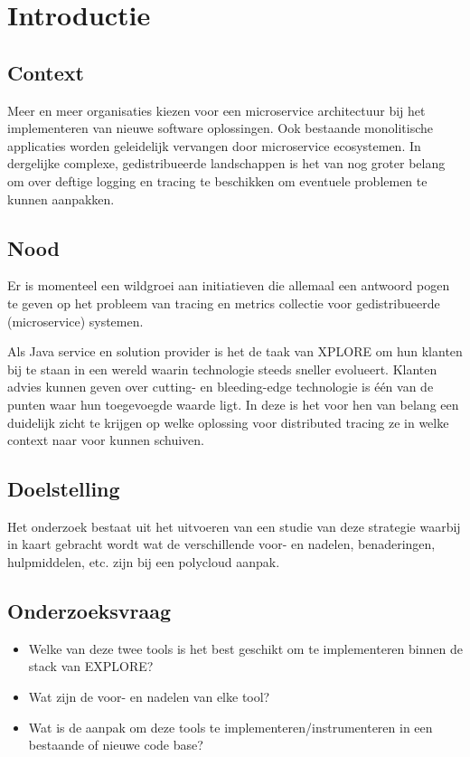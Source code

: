 
\section{Introductie} %
\label{sec:introductie}

\subsection{Context}
Meer en meer organisaties kiezen voor een microservice
architectuur bij het implementeren van nieuwe software
oplossingen. Ook bestaande monolitische applicaties
worden geleidelijk vervangen door microservice
ecosystemen. In dergelijke complexe, gedistribueerde
landschappen is het van nog groter belang om over deftige
logging en tracing te beschikken om eventuele problemen
te kunnen aanpakken.

\subsection{Nood}
Er is momenteel een wildgroei aan initiatieven die allemaal
een antwoord pogen te geven op het probleem van tracing
en metrics collectie voor gedistribueerde (microservice)
systemen.

Als Java service en solution provider is het de taak van XPLORE om
hun klanten bij te staan in een wereld waarin technologie
steeds sneller evolueert. Klanten advies kunnen geven over
cutting- en bleeding-edge technologie is één van de punten
waar hun toegevoegde waarde ligt.
In deze is het voor hen van belang een duidelijk zicht te
krijgen op welke oplossing voor distributed tracing ze in
welke context naar voor kunnen schuiven.

\subsection{Doelstelling}
Het onderzoek bestaat uit het uitvoeren van een studie van deze 
strategie waarbij in kaart gebracht wordt wat de verschillende 
voor- en nadelen, benaderingen, hulpmiddelen, etc. zijn bij een 
polycloud aanpak.

\subsection{Onderzoeksvraag}
\begin{itemize}
	\item Welke van deze twee tools is het best geschikt om te implementeren binnen de stack van EXPLORE?
	\item Wat zijn de voor- en nadelen van elke tool?
	\item Wat is de aanpak om deze tools te implementeren/instrumenteren in een bestaande of nieuwe code base?
\end{itemize}

